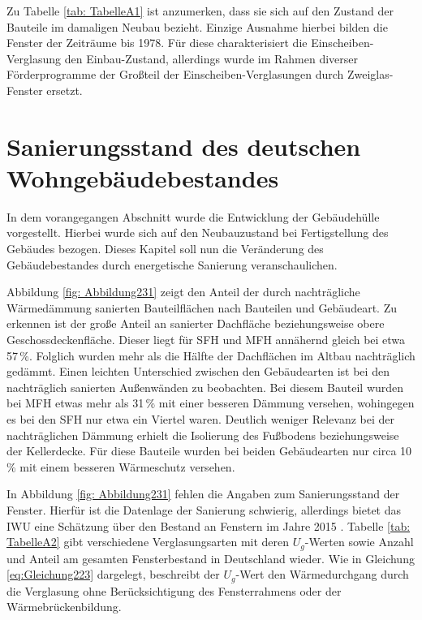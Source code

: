 Zu Tabelle \ref{tab: TabelleA1} ist anzumerken, dass sie sich auf den Zustand der Bauteile im damaligen Neubau bezieht. 
Einzige Ausnahme hierbei bilden die Fenster der Zeiträume bis 1978. 
Für diese charakterisiert die Einscheiben-Verglasung den Einbau-Zustand, allerdings wurde im Rahmen diverser Förderprogramme der Großteil der Einscheiben-Verglasungen durch Zweiglas-Fenster ersetzt.


\section{Sanierungsstand des deutschen Wohngebäudebestandes}
\label{sec:Sektion 23}

In dem vorangegangen Abschnitt wurde die Entwicklung der Gebäudehülle vorgestellt. 
Hierbei wurde sich auf den Neubauzustand bei Fertigstellung des Gebäudes bezogen.
Dieses Kapitel soll nun die Veränderung des Gebäudebestandes durch energetische Sanierung veranschaulichen.

Abbildung \ref{fig: Abbildung231} zeigt den Anteil der durch nachträgliche Wärmedämmung sanierten Bauteilflächen nach Bauteilen und Gebäudeart.
Zu erkennen ist der große Anteil an sanierter Dachfläche beziehungsweise obere Geschossdeckenfläche.
Dieser liegt für SFH und MFH annähernd gleich bei etwa 57\,\%.
Folglich wurden mehr als die Hälfte der Dachflächen im Altbau nachträglich gedämmt.
Einen leichten Unterschied zwischen den Gebäudearten ist bei den nachträglich sanierten Außenwänden zu beobachten. 
Bei diesem Bauteil wurden bei MFH etwas mehr als 31\,\% mit einer besseren Dämmung versehen, wohingegen es bei den SFH nur etwa ein Viertel waren.
Deutlich weniger Relevanz bei der nachträglichen Dämmung erhielt die Isolierung des Fußbodens beziehungsweise der Kellerdecke. 
Für diese Bauteile wurden bei beiden Gebäudearten nur circa 10\,\% mit einem besseren Wärmeschutz versehen. 

In Abbildung \ref{fig: Abbildung231} fehlen die Angaben zum Sanierungsstand der Fenster.
Hierfür ist die Datenlage der Sanierung schwierig, allerdings bietet das IWU eine Schätzung über den Bestand an Fenstern im Jahre 2015 \cite{Bigalke.2016}.
Tabelle \ref{tab: TabelleA2} gibt verschiedene Verglasungsarten mit deren \(U_g\)-Werten sowie Anzahl und Anteil am gesamten Fensterbestand in Deutschland wieder.
Wie in Gleichung \ref{eq:Gleichung223} dargelegt, beschreibt der \(U_g\)-Wert den Wärmedurchgang durch die Verglasung ohne Berücksichtigung des Fensterrahmens oder der Wärmebrückenbildung.

